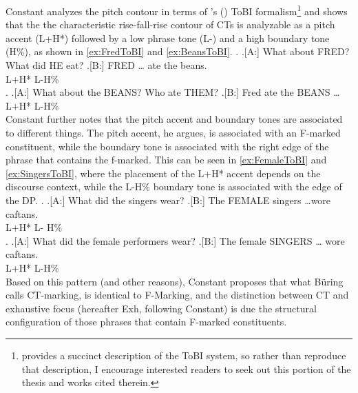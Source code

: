 \documentclass[letterpaper]{article}
\begin{document}
Constant analyzes the pitch contour in terms of \citeauthor{pierrehumbert1990meaning}'s (\citeyear{pierrehumbert1990meaning}) ToBI formalism\footnote{\textcite[14--16]{constant2014diss} provides a succinct description of the ToBI system, so rather than reproduce that description, I encourage interested readers to seek out this portion of the thesis and works cited therein.} and shows that the the characteristic rise-fall-rise contour of CTs is analyzable as a pitch accent (L+H*) followed by a low phrase tone (L-) and a high boundary tone (H\%), as shown in \ref{ex:FredToBI} and \ref{ex:BeansToBI}.
\ex.\label{ex:FredToBI}
\a.[A:] What about FRED? What did HE eat?
\bg.[B:] FRED {\ldots} {ate the beans.}\\
L+H* L-H\% {}\\

\ex.\label{ex:BeansToBI}
\a.[A:] What about the BEANS? Who ate THEM?
\bg.[B:] {Fred ate the} BEANS \ldots\\
{} L+H* L-H\%\\

Constant further notes that the pitch accent and boundary tones are associated to different things.
The pitch accent, he argues, is associated with an F-marked constituent, while the boundary tone is associated with the right edge of the phrase that contains the f-marked.
This can be seen in \ref{ex:FemaleToBI} and \ref{ex:SingersToBI}, where the placement of the L+H* accent depends on the discourse context, while the L-H\% boundary tone is associated with the edge of the DP.
\ex.\label{ex:FemaleToBI}
\a.[A:] What did the singers wear?
\bg.[B:] The {\hspace{1em}FEMALE} singers \ldots {wore caftans.}\\
{} L+H* {\hspace{2em}L-} H\% {}\\

\ex.\label{ex:SingersToBI}
\a.[A:] What did the female performers wear?
\bg.[B:] {The female} {\hspace{1em}SINGERS} {\hspace{1em}\ldots} {wore caftans.}\\
{} L+H* L-H\% {}\\

Based on this pattern (and other reasons), Constant proposes that what B\"uring calls CT-marking, is identical to F-Marking, and the distinction between CT and exhaustive focus (hereafter Exh, following Constant) is due the structural configuration of those phrases that contain F-marked constituents.
\end{document}
